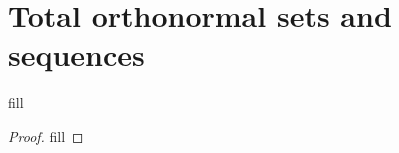 \section{Total orthonormal sets and sequences}

\begin{exercise}{1}
fill
\end{exercise}
\begin{proof}
fill
\end{proof}